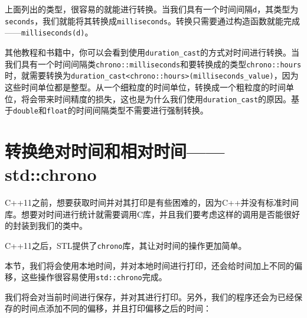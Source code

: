 上面列出的类型，很容易的就能进行转换。当我们具有一个时间间隔\texttt{d}，其类型为\texttt{seconds}，我们就能将其转换成\texttt{milliseconds}。转换只需要通过构造函数就能完成——\texttt{milliseconds(d)}。


其他教程和书籍中，你可以会看到使用\texttt{duration\_cast}的方式对时间进行转换。当我们具有一个时间间隔类\texttt{chrono::milliseconds}和要转换成的类型\texttt{chrono::hours}时，就需要转换为\texttt{duration\_cast<chrono::hours>(milliseconds\_value)}，因为这些时间单位都是整型。从一个细粒度的时间单位，转换成一个粗粒度的时间单位，将会带来时间精度的损失，这也是为什么我们使用\texttt{duration\_cast}的原因。基于\texttt{double}和\texttt{float}的时间间隔类型不需要进行强制转换。


\section{转换绝对时间和相对时间——std::chrono}

C++11之前，想要获取时间并对其打印是有些困难的，因为C++并没有标准时间库。想要对时间进行统计就需要调用C库，并且我们要考虑这样的调用是否能很好的封装到我们的类中。

C++11之后，STL提供了\texttt{chrono}库，其让对时间的操作更加简单。

本节，我们将会使用本地时间，并对本地时间进行打印，还会给时间加上不同的偏移，这些操作很容易使用\texttt{std::chrono}完成。


我们将会对当前时间进行保存，并对其进行打印。另外，我们的程序还会为已经保存的时间点添加不同的偏移，并且打印偏移之后的时间：


